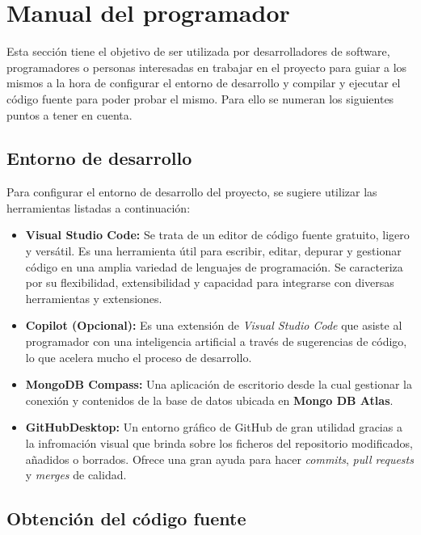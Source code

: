 \section{Manual del programador}

Esta sección tiene el objetivo de ser utilizada por desarrolladores de software, programadores o personas interesadas en trabajar en el proyecto para guiar a los mismos a la hora de configurar el entorno de desarrollo y compilar y ejecutar el código fuente para poder probar el mismo. Para ello se numeran los siguientes puntos a tener en cuenta.

\subsection{Entorno de desarrollo}

Para configurar el entorno de desarrollo del proyecto, se sugiere utilizar las herramientas listadas a continuación:

\begin{itemize}
	\item \textbf{Visual Studio Code:} Se trata de un editor de código fuente gratuito, ligero y versátil. Es una herramienta útil para escribir, editar, depurar y gestionar código en una amplia variedad de lenguajes de programación. Se caracteriza por su flexibilidad, extensibilidad y capacidad para integrarse con diversas herramientas y extensiones. 
	\item \textbf{Copilot (Opcional):} Es una extensión de \textit{Visual Studio Code} que asiste al programador con una inteligencia artificial a través de sugerencias de código, lo que acelera mucho el proceso de desarrollo.
	\item \textbf{MongoDB Compass:} Una aplicación de escritorio desde la cual gestionar la conexión y contenidos de la base de datos ubicada en \textbf{Mongo DB Atlas\cite{mongodb_atlas}}.
    \item \textbf{GitHubDesktop:} Un entorno gráfico de GitHub de gran utilidad gracias a la infromación visual que brinda sobre los ficheros del repositorio modificados, añadidos o borrados. Ofrece una gran ayuda para hacer \textit{commits}, \textit{pull requests} y \textit{merges} de calidad.
\end{itemize}

\subsection{Obtención del código fuente}

